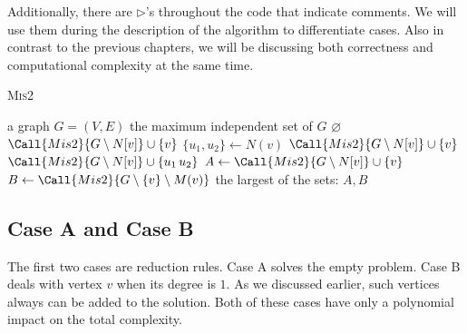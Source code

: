 Additionally, there are $\triangleright$'s throughout the code that indicate comments. We will use them during the description of the algorithm to differentiate cases. Also in contrast to the previous chapters, we will be discussing both correctness and computational complexity at the same time.

\begin{algorithm} [H]
\caption{\textsc{Mis2}}\label{mis2:1}
\begin{algorithmic}[1]
\Require a graph $G=(V,E)$
\Ensure the maximum independent set of $G$
        \State \Return $\varnothing$ 
    \EndIf
    \State
         \State \Return $\Call{Mis2}{G\setminus N[v]} \cup \{v\}$  
    \EndIf
    \State
        \State $\{u_1, u_2\} \gets N(v)$        
            \State \Return $\Call{Mis2}{G\setminus N[v]} \cup \{v\}$  
        \Else
                \State \Return $\Call{Mis2}{G\setminus N[v]} \cup \{u_1\, u_2\}$  
            \Else
                \State $A \gets \Call{Mis2}{G\setminus N[v]} \cup \{v\}$
                \State $B \gets \Call{Mis2}{G\setminus \{v\} \setminus M(v)}$
                \State \Return the largest of the sets: $A, B$ 
            \EndIf
        \EndIf        
    \EndIf    
{}    
\end{algorithmic}
\end{algorithm}

\subsection{Case A and Case B}
The first two cases are reduction rules. Case A solves the empty problem. Case B deals with vertex $v$ when its degree is $1$. As we discussed earlier, such vertices always can be added to the solution. Both of these cases have only a polynomial impact on the total complexity.

